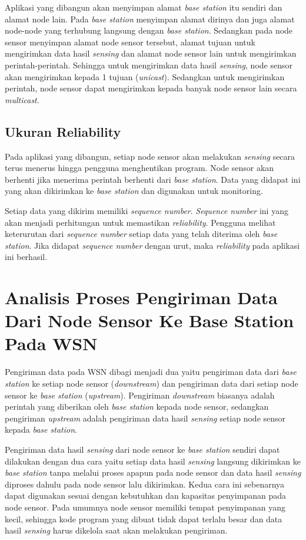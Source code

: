 Aplikasi yang dibangun akan menyimpan alamat \textit{base station} itu sendiri dan alamat node lain. Pada \textit{base station} menyimpan alamat dirinya dan juga alamat node-node yang terhubung langsung dengan \textit{base station}. Sedangkan pada node sensor menyimpan alamat node sensor tersebut, alamat tujuan untuk mengirimkan data hasil \textit{sensing} dan alamat node sensor lain untuk mengirimkan perintah-perintah. Sehingga untuk mengirimkan data hasil \textit{sensing}, node sensor akan mengirimkan kepada 1 tujuan (\textit{unicast}). Sedangkan untuk mengirimkan perintah, node sensor dapat mengirimkan kepada banyak node sensor lain secara \textit{multicast}.

\subsection{Ukuran Reliability}
Pada aplikasi yang dibangun, setiap node sensor akan melakukan \textit{sensing} secara terus menerus hingga pengguna menghentikan program. Node sensor akan berhenti jika menerima perintah berhenti dari \textit{base station}. Data yang didapat ini yang akan dikirimkan ke \textit{base station} dan digunakan untuk monitoring.

Setiap data yang dikirim memiliki \textit{sequence number}. \textit{Sequence number} ini yang akan menjadi perhitungan untuk memastikan \textit{reliability}. Pengguna melihat keterurutan dari \textit{sequence number} setiap data yang telah diterima oleh \textit{base station}. Jika didapat \textit{sequence number} dengan urut, maka \textit{reliability} pada aplikasi ini berhasil.

\section{Analisis Proses Pengiriman Data Dari Node Sensor Ke Base Station Pada WSN}
Pengiriman data pada WSN dibagi menjadi dua yaitu pengiriman data dari \textit{base station} ke setiap node sensor (\textit{downstream}) dan pengiriman data dari setiap node sensor ke \textit{base station} (\textit{upstream}). Pengiriman \textit{downstream} biasanya adalah perintah yang diberikan oleh \textit{base station} kepada node sensor, sedangkan pengiriman \textit{upstream} adalah pengiriman data hasil \textit{sensing} setiap node sensor kepada \textit{base station}. 

Pengiriman data hasil \textit{sensing} dari node sensor ke \textit{base station} sendiri dapat dilakukan dengan dua cara yaitu setiap data hasil \textit{sensing} langsung dikirimkan ke \textit{base station} tanpa melalui proses apapun pada node sensor dan data hasil \textit{sensing} diproses dahulu pada node sensor lalu dikirimkan. Kedua cara ini sebenarnya dapat digunakan sesuai dengan kebutuhkan dan kapasitas penyimpanan pada node sensor. Pada umumnya node sensor memiliki tempat penyimpanan yang kecil, sehingga kode program yang dibuat tidak dapat terlalu besar dan data hasil \textit{sensing} harus dikelola saat akan melakukan pengiriman.

